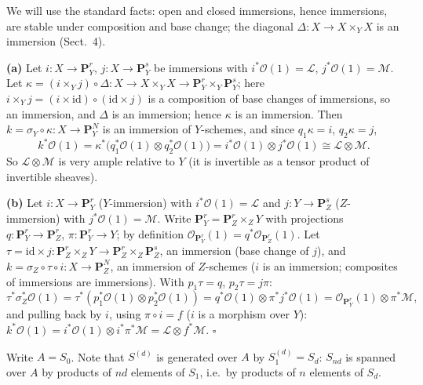 \documentclass[11pt]{article}
\begin{document}
We will use the standard facts: open and closed immersions, hence immersions, are stable under composition and base change; the diagonal $\Delta:X\to X\times_YX$ is an immersion (Sect.~4).

\textbf{(a)} Let $i:X\to\mathbf P^r_Y$, $j:X\to\mathbf P^s_Y$ be immersions with $i^*\mathcal O(1)=\mathcal L$, $j^*\mathcal O(1)=\mathcal M$. Let $\kappa=(i\times_Yj)\circ\Delta:X\to X\times_YX\to\mathbf P^r_Y\times_Y\mathbf P^s_Y$; here $i\times_Yj=(i\times\mathrm{id})\circ(\mathrm{id}\times j)$ is a composition of base changes of immersions, so an immersion, and $\Delta$ is an immersion; hence $\kappa$ is an immersion. Then $k=\sigma_Y\circ\kappa:X\to\mathbf P^N_Y$ is an immersion of $Y$-schemes, and since $q_1\kappa=i$, $q_2\kappa=j$,
\[
k^*\mathcal O(1)=\kappa^*\big(q_1^*\mathcal O(1)\otimes q_2^*\mathcal O(1)\big)=i^*\mathcal O(1)\otimes j^*\mathcal O(1)\cong\mathcal L\otimes\mathcal M.
\]
So $\mathcal L\otimes\mathcal M$ is very ample relative to $Y$ (it is invertible as a tensor product of invertible sheaves).

\textbf{(b)} Let $i:X\to\mathbf P^r_Y$ ($Y$-immersion) with $i^*\mathcal O(1)=\mathcal L$ and $j:Y\to\mathbf P^s_Z$ ($Z$-immersion) with $j^*\mathcal O(1)=\mathcal M$. Write $\mathbf P^r_Y=\mathbf P^r_Z\times_ZY$ with projections $q:\mathbf P^r_Y\to\mathbf P^r_Z$, $\pi:\mathbf P^r_Y\to Y$; by definition $\mathcal O_{\mathbf P^r_Y}(1)=q^*\mathcal O_{\mathbf P^r_Z}(1)$. Let $\tau=\mathrm{id}\times j:\mathbf P^r_Z\times_ZY\to\mathbf P^r_Z\times_Z\mathbf P^s_Z$, an immersion (base change of $j$), and $k=\sigma_Z\circ\tau\circ i:X\to\mathbf P^N_Z$, an immersion of $Z$-schemes ($i$ is an immersion; composites of immersions are immersions). With $p_1\tau=q$, $p_2\tau=j\pi$:
\[
\tau^*\sigma_Z^*\mathcal O(1)=\tau^*(p_1^*\mathcal O(1)\otimes p_2^*\mathcal O(1))=q^*\mathcal O(1)\otimes\pi^*j^*\mathcal O(1)=\mathcal O_{\mathbf P^r_Y}(1)\otimes\pi^*\mathcal M,
\]
and pulling back by $i$, using $\pi\circ i=f$ ($i$ is a morphism over $Y$): $k^*\mathcal O(1)=i^*\mathcal O(1)\otimes i^*\pi^*\mathcal M=\mathcal L\otimes f^*\mathcal M$. \hfill$\square$

\pf
Write $A=S_0$. Note that $S^{(d)}$ is generated over $A$ by $S^{(d)}_1=S_d$: $S_{nd}$ is spanned over $A$ by products of $nd$ elements of $S_1$, i.e.\ by products of $n$ elements of $S_d$.
\end{document}
